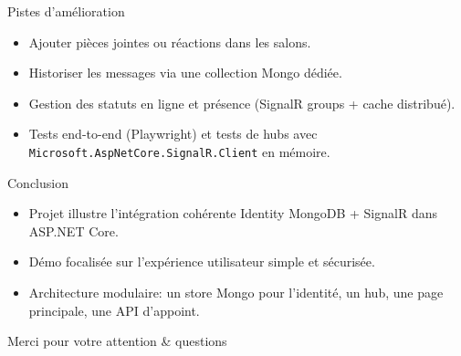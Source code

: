 \documentclass[10pt]{beamer}
\begin{document}
\begin{frame}{Pistes d'amélioration}
  \begin{itemize}
    \item Ajouter pièces jointes ou réactions dans les salons.
    \item Historiser les messages via une collection Mongo dédiée.
    \item Gestion des statuts en ligne et présence (SignalR groups + cache distribué).
    \item Tests end-to-end (Playwright) et tests de hubs avec \texttt{Microsoft.AspNetCore.SignalR.Client} en mémoire.
  \end{itemize}
\end{frame}

\begin{frame}{Conclusion}
  \begin{itemize}
    \item Projet illustre l'intégration cohérente Identity MongoDB + SignalR dans ASP.NET Core.
    \item Démo focalisée sur l'expérience utilisateur simple et sécurisée.
    \item Architecture modulaire: un store Mongo pour l'identité, un hub, une page principale, une API d'appoint.
  \end{itemize}
  \vfill
  \begin{center}
    Merci pour votre attention \& questions
  \end{center}
\end{frame}
\end{document}
